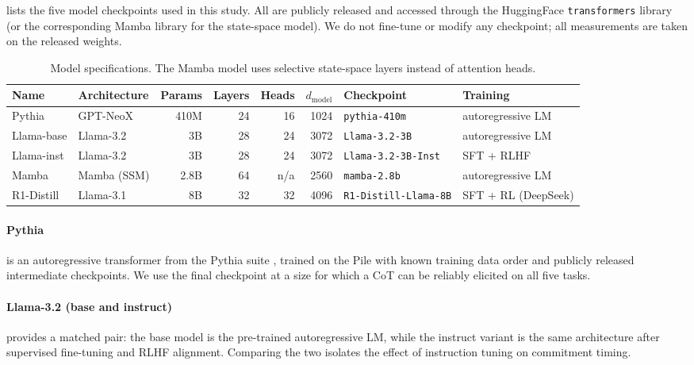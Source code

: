 \documentclass[11pt]{article}
\begin{document}
 lists the five model checkpoints used in this study.
All are publicly released and accessed through the HuggingFace
\texttt{transformers} library (or the corresponding Mamba library for the
state-space model). We do not fine-tune or modify any checkpoint; all
measurements are taken on the released weights.

\begin{table}[t]
\centering\small
\setlength{\tabcolsep}{3.5pt}
\begin{tabular}{@{}llrrrrll@{}}
\toprule
Name & Architecture & Params & Layers & Heads & $d_\mathrm{model}$ & Checkpoint & Training \\
\midrule
Pythia     & GPT-NeoX & 410M & 24 & 16 & 1024 & \texttt{pythia-410m} & autoregressive LM \\
Llama-base & Llama-3.2 & 3B & 28 & 24 & 3072 & \texttt{Llama-3.2-3B} & autoregressive LM \\
Llama-inst & Llama-3.2 & 3B & 28 & 24 & 3072 & \texttt{Llama-3.2-3B-Inst} & SFT + RLHF \\
Mamba      & Mamba (SSM) & 2.8B & 64 & n/a & 2560 & \texttt{mamba-2.8b} & autoregressive LM \\
R1-Distill & Llama-3.1 & 8B & 32 & 32 & 4096 & \texttt{R1-Distill-Llama-8B} & SFT + RL (DeepSeek) \\
\bottomrule
\end{tabular}
\caption{Model specifications. 
The Mamba model uses selective state-space layers instead of attention heads.}
\label{tab:model-specs}
\end{table}

\paragraph{Pythia} is an autoregressive transformer from the Pythia suite
\citep{DBLP:conf/icml/BidermanSABOHKP23}, trained on the Pile with known
training data order and publicly released intermediate checkpoints. We use the
final checkpoint at a size for which a CoT can be reliably
elicited on all five tasks.

\paragraph{Llama-3.2 (base and instruct)} provides a matched pair: the base
model is the pre-trained autoregressive LM, while the instruct variant is the
same architecture after supervised fine-tuning and RLHF alignment. Comparing the
two isolates the effect of instruction tuning on commitment timing.
\end{document}
